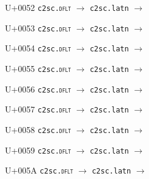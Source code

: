 \documentclass{article}
\begin{document}
\begin{substitutions}
\goodbreak

U+0052  \linebreak
    \texttt{c2sc.\textsc{dflt}} $\to$  \linebreak
    \texttt{c2sc.latn} $\to$  

\goodbreak

U+0053  \linebreak
    \texttt{c2sc.\textsc{dflt}} $\to$  \linebreak
    \texttt{c2sc.latn} $\to$  

\goodbreak

U+0054  \linebreak
    \texttt{c2sc.\textsc{dflt}} $\to$  \linebreak
    \texttt{c2sc.latn} $\to$  

\goodbreak

U+0055  \linebreak
    \texttt{c2sc.\textsc{dflt}} $\to$  \linebreak
    \texttt{c2sc.latn} $\to$  

\goodbreak

U+0056  \linebreak
    \texttt{c2sc.\textsc{dflt}} $\to$  \linebreak
    \texttt{c2sc.latn} $\to$  

\goodbreak

U+0057  \linebreak
    \texttt{c2sc.\textsc{dflt}} $\to$  \linebreak
    \texttt{c2sc.latn} $\to$  

\goodbreak

U+0058  \linebreak
    \texttt{c2sc.\textsc{dflt}} $\to$  \linebreak
    \texttt{c2sc.latn} $\to$  

\goodbreak

U+0059  \linebreak
    \texttt{c2sc.\textsc{dflt}} $\to$  \linebreak
    \texttt{c2sc.latn} $\to$  

\goodbreak

U+005A  \linebreak
    \texttt{c2sc.\textsc{dflt}} $\to$  \linebreak
    \texttt{c2sc.latn} $\to$  


\end{substitutions}
\end{document}
